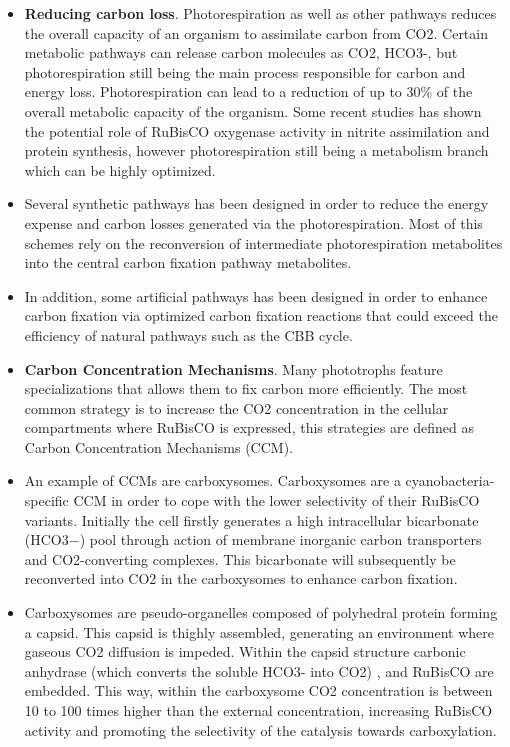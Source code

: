 \begin{itemize}
\item[] \textbf{Reducing carbon loss}.  Photorespiration as well as other pathways reduces the overall capacity of an organism to assimilate carbon from CO2. Certain metabolic pathways can release carbon molecules as CO2, HCO3-, but photorespiration still being the main process responsible for carbon and energy loss. Photorespiration can lead to a reduction of up to 30\% of the overall metabolic capacity of the organism. Some recent studies has shown the potential role of RuBisCO oxygenase activity in nitrite assimilation and protein synthesis, however photorespiration still being a metabolism branch which can be highly optimized.
    \item[] Several synthetic pathways has been designed in order to reduce the energy expense and carbon losses generated via the photorespiration. Most of this schemes rely on the reconversion of intermediate photorespiration metabolites into the central carbon fixation pathway metabolites.
    \item[] In addition, some artificial pathways has been designed in order to enhance carbon fixation via optimized carbon fixation reactions that could exceed the efficiency of natural pathways such as the CBB cycle.
\item[] \textbf{Carbon Concentration Mechanisms}. Many phototrophs feature specializations that allows them to fix carbon more efficiently. The most common strategy is to increase the CO2 concentration in the cellular compartments where RuBisCO is expressed, this strategies are defined as Carbon Concentration Mechanisms (CCM).
    \item[] An example of CCMs are carboxysomes. Carboxysomes are a cyanobacteria-specific CCM in order to cope with the lower selectivity of their RuBisCO variants. Initially the cell firstly generates a high intracellular bicarbonate (HCO3−) pool through action of membrane inorganic carbon transporters and CO2-converting complexes. This bicarbonate will subsequently be reconverted into CO2 in the carboxysomes to enhance carbon fixation.
    \item[] Carboxysomes are pseudo-organelles composed of polyhedral protein forming a capsid. This capsid is thighly assembled, generating an environment where gaseous CO2 diffusion is impeded. Within the capsid structure carbonic anhydrase (which converts the soluble HCO3- into CO2) , and RuBisCO  are embedded. This way, within the carboxysome CO2 concentration is between 10 to 100 times higher than the external concentration, increasing RuBisCO activity and promoting the selectivity of the catalysis towards carboxylation.

\end{itemize}
